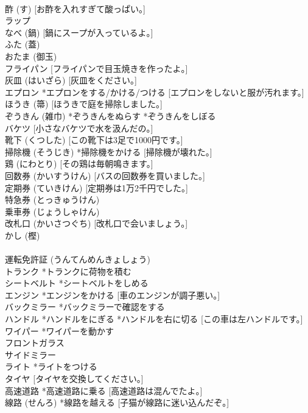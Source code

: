 \documentclass[8pt]{extreport}
\begin{document}
\begin{CJK}{UTF8}{min}
\\	酢 (す) [お酢を入れすぎて酸っぱい。]
\\	ラップ
\\	なべ (鍋) [鍋にスープが入っているよ。]
\\	ふた (蓋)
\\	おたま (御玉)
\\	フライパン [フライパンで目玉焼きを作ったよ。]
\\	灰皿 (はいざら) [灰皿をください。]
\\	エプロン *エプロンをする/かける/つける [エプロンをしないと服が汚れます。]
\\	ほうき (箒) [ほうきで庭を掃除しました。]
\\	ぞうきん (雑巾) *ぞうきんをぬらす *ぞうきんをしぼる
\\	バケツ [小さなバケツで水を汲んだの。]
\\	靴下 (くつした) [この靴下は3足で1000円です。]
\\	掃除機 (そうじき) *掃除機をかける [掃除機が壊れた。]
\\	鶏 (にわとり) [その鶏は毎朝鳴きます。]
\\	回数券 (かいすうけん) [バスの回数券を買いました。]
\\	定期券 (ていきけん) [定期券は1万2千円でした。]
\\	特急券 (とっきゅうけん)
\\	乗車券 (じょうしゃけん)
\\	改札口 (かいさつぐち) [改札口で会いましょう。]
\\	かし (樫) 
\\	[～の木]
\\	運転免許証 (うんてんめんきょしょう)
\\	トランク *トランクに荷物を積む
\\	シートベルト *シートベルトをしめる
\\	エンジン *エンジンをかける [車のエンジンが調子悪い。]
\\	バックミラー *バックミラーで確認をする
\\	ハンドル *ハンドルをにぎる *ハンドルを右に切る [この車は左ハンドルです。]
\\	ワイパー *ワイパーを動かす
\\	フロントガラス
\\	サイドミラー
\\	ライト *ライトをつける
\\	タイヤ [タイヤを交換してください。]
\\	高速道路 *高速道路に乗る [高速道路は混んでたよ。]
\\	線路 (せんろ) *線路を越える [子猫が線路に迷い込んだぞ。]

\end{CJK}
\end{document}
